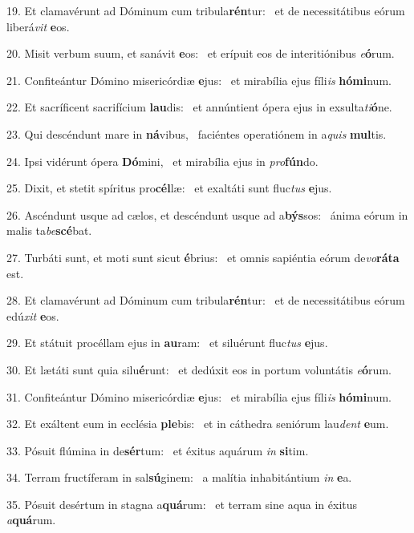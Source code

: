 19. Et clamavérunt ad Dóminum cum tribula\textbf{rén}tur: \ast\  et de necessitátibus eórum liberá\textit{vit} \textbf{e}os.\

20. Misit verbum suum, et sanávit \textbf{e}os: \ast\  et erípuit eos de interitiónibus \textit{e}\textbf{ó}rum.\

21. Confiteántur Dómino misericórdiæ \textbf{e}jus: \ast\  et mirabília ejus fíli\textit{is} \textbf{hó}\textbf{mi}num.\

22. Et sacríficent sacrifícium \textbf{lau}dis: \ast\  et annúntient ópera ejus in exsulta\textit{ti}\textbf{ó}ne.\

23. Qui descéndunt mare in \textbf{ná}vibus, \ast\  faciéntes operatiónem in a\textit{quis} \textbf{mul}tis.\

24. Ipsi vidérunt ópera \textbf{Dó}mini, \ast\  et mirabília ejus in \textit{pro}\textbf{fún}do.\

25. Dixit, et stetit spíritus pro\textbf{cél}læ: \ast\  et exaltáti sunt fluc\textit{tus} \textbf{e}jus.\

26. Ascéndunt usque ad cælos, et descéndunt usque ad a\textbf{býs}sos: \ast\  ánima eórum in malis ta\textit{be}\textbf{scé}bat.\

27. Turbáti sunt, et moti sunt sicut \textbf{é}brius: \ast\  et omnis sapiéntia eórum de\textit{vo}\textbf{rá}\textbf{ta} est.\

28. Et clamavérunt ad Dóminum cum tribula\textbf{rén}tur: \ast\  et de necessitátibus eórum edú\textit{xit} \textbf{e}os.\

29. Et státuit procéllam ejus in \textbf{au}ram: \ast\  et siluérunt fluc\textit{tus} \textbf{e}jus.\

30. Et lætáti sunt quia silu\textbf{é}runt: \ast\  et dedúxit eos in portum voluntátis \textit{e}\textbf{ó}rum.\

31. Confiteántur Dómino misericórdiæ \textbf{e}jus: \ast\  et mirabília ejus fíli\textit{is} \textbf{hó}\textbf{mi}num.\

32. Et exáltent eum in ecclésia \textbf{ple}bis: \ast\  et in cáthedra seniórum lau\textit{dent} \textbf{e}um.\

33. Pósuit flúmina in de\textbf{sér}tum: \ast\  et éxitus aquárum \textit{in} \textbf{si}tim.\

34. Terram fructíferam in sal\textbf{sú}ginem: \ast\  a malítia inhabitántium \textit{in} \textbf{e}a.\

35. Pósuit desértum in stagna a\textbf{quá}rum: \ast\  et terram sine aqua in éxitus \textit{a}\textbf{quá}rum.\

